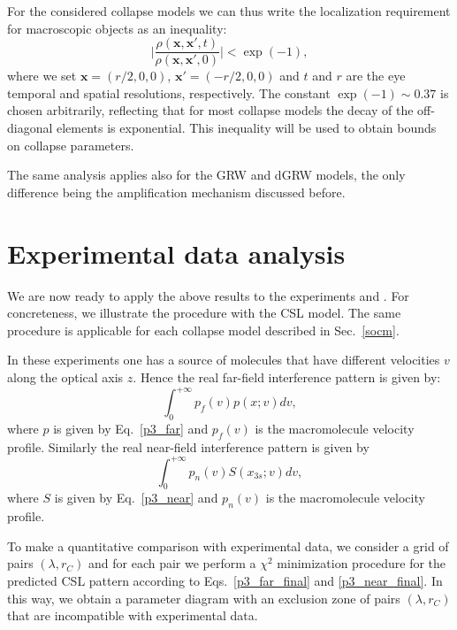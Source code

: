 \documentclass[12pt,groupedaddress,pra,aps]{revtex4-1}
\begin{document}
For the considered collapse models we can thus write the localization requirement for macroscopic objects as an inequality:
\begin{equation}
\biggr\lvert \frac{\rho\left(\bm{x},\bm{x}',t\right)}{\rho\left(\bm{x},\bm{x}',0\right)} \biggr\rvert  < \exp(-1),
\end{equation}
where we set $\bm{x}=(r/2,0,0)$, $\bm{x}'=(-r/2,0,0)$ and $t$ and $r$ are the eye temporal and spatial resolutions, respectively. The constant $\exp(-1) \sim 0.37$ is chosen arbitrarily, reflecting that for most collapse models the decay of the off-diagonal elements is exponential. This inequality will be used to obtain bounds on collapse parameters.

The same analysis applies also for the GRW and dGRW models, the only difference being the amplification mechanism discussed before.


\clearpage
\section{Experimental data analysis}\label{desec} 
We are now ready to apply the above results to the experiments \cite{MSCH} and \cite{C3CP51500A}. For concreteness, we illustrate the procedure with the CSL model. The same procedure is applicable for each collapse model described in Sec.~\ref{socm}.

In these experiments one has a source of molecules that have different velocities $v$ along the optical axis $z$.  Hence the real far-field interference pattern is given by:
\begin{equation}\label{p3_far_final}
\int_0^{+\infty} p_f(v) p(x;v) dv,
\end{equation}
where $p$ is given by Eq.~\eqref{p3_far} and $p_f(v)$ is the macromolecule velocity profile.
Similarly the real near-field interference pattern is given by
\begin{equation}\label{p3_near_final}
\int_0^{+\infty} p_n(v) S(x_{3s};v) dv,
\end{equation}
where $S$ is given by Eq.~\eqref{p3_near} and $p_n(v)$ is the macromolecule velocity profile.

To make a quantitative comparison with experimental data, we consider a grid of  pairs $(\lambda,r_C)$ and for each pair we perform a $\chi^2$ minimization procedure for the predicted CSL pattern according to Eqs.~\eqref{p3_far_final} and \eqref{p3_near_final}. In this way, we obtain a parameter diagram with an exclusion zone of pairs $(\lambda,r_C)$ that are incompatible with experimental data. 
\end{document}
